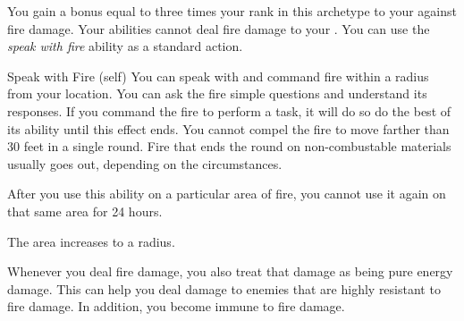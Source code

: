              You gain a bonus equal to three times your rank in this archetype to your  against fire damage.
             Your abilities cannot deal fire damage to your .
             You can use the \textit{speak with fire} ability as a standard action.
            \begin{attuneability}{Speak with Fire}
                 (self)
                \rankline
                You can speak with and command fire within a \areahuge radius  from your location.
                You can ask the fire simple questions and understand its responses.
                If you command the fire to perform a task, it will do so do the best of its ability until this effect ends.
                You cannot compel the fire to move farther than 30 feet in a single round.
                Fire that ends the round on non-combustable materials usually goes out, depending on the circumstances.

                After you use this ability on a particular area of fire, you cannot use it again on that same area for 24 hours.

                \rankline
                 The area increases to a \areagarg radius.
            \end{attuneability}
             Whenever you deal fire damage, you also treat that damage as being pure energy damage.
            This can help you deal damage to enemies that are highly resistant to fire damage.
            In addition, you become immune to fire damage.

